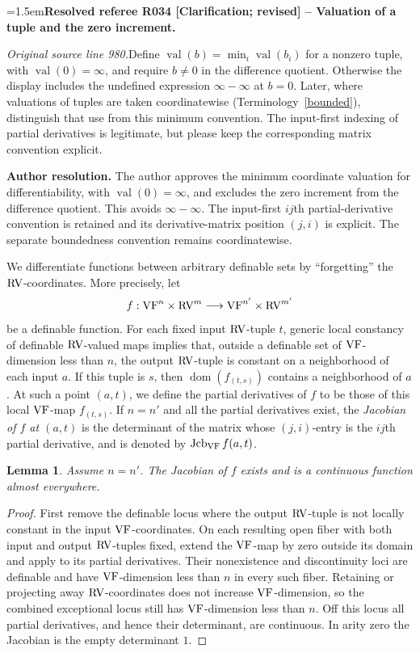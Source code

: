 \documentclass[12pt]{amsart}
\newcommand{\ResolvedRefereeRemark}[5]{%
  \par\medskip\begingroup\normalfont\small\color{gray}%
  \emergencystretch=1.5em\noindent\textbf{Resolved referee R#1 [#2] -- #3.}\par\nobreak\noindent #4\par
  \medskip\color{ResolutionGreen}\noindent\textbf{Author resolution.} #5\par
  \endgroup\medskip
}
\newcommand{\memph}[1]{{\color{magenta}\emph{#1}}}
\theoremstyle{plain}
\newtheorem{lem}[thm]{Lemma}
\theoremstyle{definition}
\theoremstyle{remark}
\numberwithin{equation}{section}
\theoremstyle{plain}
\newcommand{\VF}{\textup{VF}}
\newcommand{\RV}{\textup{RV}}
\DeclareMathOperator{\dom}{dom}
\DeclareMathOperator{\jcb}{Jcb}
\newcommand{\0}{\emptyset}
\newcommand{\fun}{\longrightarrow}
\DeclareMathOperator{\vv}{val}
\begin{document}
\ResolvedRefereeRemark{034}{Clarification; revised}{Valuation of a tuple and the zero increment}{%
\textit{Original source line 980.}\quad Define $\vv(b)=\min_i\vv(b_i)$ for a nonzero tuple, with $\vv(0)=\infty$, and require $b\ne0$ in the difference quotient. Otherwise the display includes the undefined expression $\infty-\infty$ at $b=0$. Later, where valuations of tuples are taken coordinatewise (Terminology~\ref{bounded}), distinguish that use from this minimum convention. The input-first indexing of partial derivatives is legitimate, but please keep the corresponding matrix convention explicit.
}{The author approves the minimum coordinate valuation for differentiability, with $\vv(0)=\infty$, and excludes the zero increment from the difference quotient. This avoids $\infty-\infty$. The input-first $ij$th partial-derivative convention is retained and its derivative-matrix position $(j,i)$ is explicit. The separate boundedness convention remains coordinatewise.}

We differentiate functions between arbitrary definable sets by ``forgetting'' the $\RV$-coordinates. More precisely, let
\[
f : \VF^n \times \RV^m \fun \VF^{n'} \times \RV^{m'}
\]
be a definable function. For each fixed input $\RV$-tuple $t$, generic local constancy of definable $\RV$-valued maps \cite[Lemma~8.9]{Yin:special:trans} implies that, outside a definable set of $\VF$-dimension less than $n$, the output $\RV$-tuple is constant on a neighborhood of each input $a$. If this tuple is $s$, then $\dom(f_{(t,s)})$ contains a neighborhood of $a$. At such a point $(a,t)$, we define the partial derivatives of $f$ to be those of this local $\VF$-map $f_{(t,s)}$. If $n = n'$ and all the partial derivatives exist, the \memph{Jacobian of $f$ at $(a,t)$} is the determinant of the matrix whose $(j,i)$-entry is the $ij$th partial derivative, and is denoted by $\jcb_{\VF} f(a,t)$.

\begin{lem}\label{diff:almost:every}
Assume $n=n'$. The Jacobian of $f$ exists and is a continuous function almost everywhere.
\end{lem}
\begin{proof}
First remove the definable locus where the output $\RV$-tuple is not locally constant in the input $\VF$-coordinates. On each resulting open fiber with both input and output $\RV$-tuples fixed, extend the $\VF$-map by zero outside its domain and apply \cite[Corollary~9.9]{Yin:special:trans} to its partial derivatives. Their nonexistence and discontinuity loci are definable and have $\VF$-dimension less than $n$ in every such fiber. Retaining or projecting away $\RV$-coordinates does not increase $\VF$-dimension, so the combined exceptional locus still has $\VF$-dimension less than $n$. Off this locus all partial derivatives, and hence their determinant, are continuous. In arity zero the Jacobian is the empty determinant $1$.
\end{proof}
\end{document}

